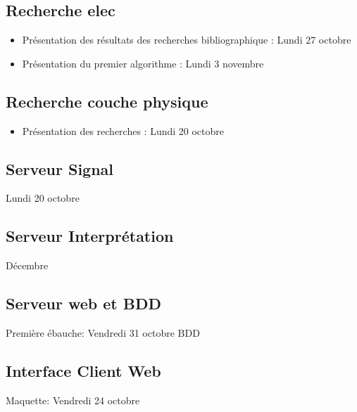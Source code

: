 \documentclass[10pt,a4paper]{article}
\begin{document}
\subsection{Recherche elec}
\begin{itemize}
	\item Présentation des résultats des recherches bibliographique : Lundi 27 octobre
	\item Présentation du premier algorithme : Lundi 3 novembre
\end{itemize}
\subsection{Recherche couche physique}
\begin{itemize}
	\item Présentation des recherches : Lundi 20 octobre
\end{itemize}
\subsection{Serveur Signal}
Lundi 20 octobre
\subsection{Serveur Interprétation}
Décembre
\subsection{Serveur web et BDD}
Première ébauche: Vendredi 31 octobre BDD
\subsection{Interface Client Web}
Maquette: Vendredi 24 octobre
\end{document}
